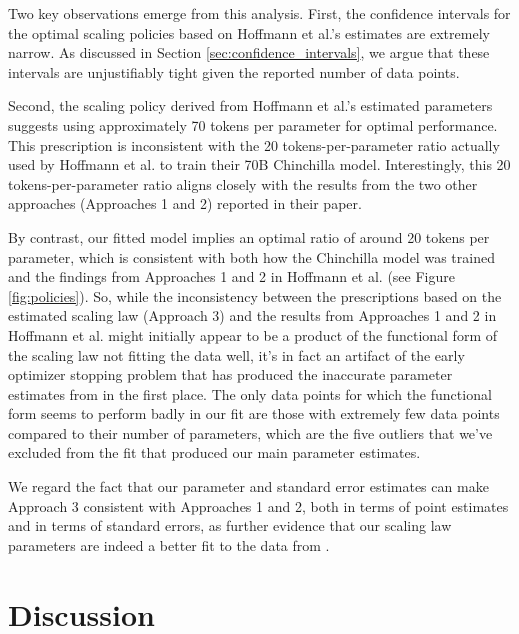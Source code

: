 \documentclass[twocolumn]{article}
\begin{document}
Two key observations emerge from this analysis. First, the confidence intervals for the optimal scaling policies based on Hoffmann et al.'s estimates are extremely narrow. As discussed in Section \ref{sec:confidence_intervals}, we argue that these intervals are unjustifiably tight given the reported number of data points.

Second, the scaling policy derived from Hoffmann et al.'s estimated parameters suggests using approximately 70 tokens per parameter for optimal performance. This prescription is inconsistent with the 20 tokens-per-parameter ratio actually used by Hoffmann et al. to train their 70B Chinchilla model. Interestingly, this 20 tokens-per-parameter ratio aligns closely with the results from the two other approaches (Approaches 1 and 2) reported in their paper.

By contrast, our fitted model implies an optimal ratio of around 20 tokens per parameter, which is consistent with both how the Chinchilla model was trained and the findings from Approaches 1 and 2 in Hoffmann et al. (see Figure \ref{fig:policies}). So, while the inconsistency between the prescriptions based on the estimated scaling law (Approach 3) and the results from Approaches 1 and 2 in Hoffmann et al. might initially appear to be a product of the functional form of the scaling law not fitting the data well, it's in fact an artifact of the early optimizer stopping problem that has produced the inaccurate parameter estimates from \cite{hoffmann2022training} in the first place. The only data points for which the functional form seems to perform badly in our fit are those with extremely few data points compared to their number of parameters, which are the five outliers that we've excluded from the fit that produced our main parameter estimates.

We regard the fact that our parameter and standard error estimates can make Approach 3 consistent with Approaches 1 and 2, both in terms of point estimates and in terms of standard errors, as further evidence that our scaling law parameters are indeed a better fit to the data from \cite{hoffmann2022training}.

\section{Discussion}
\end{document}
